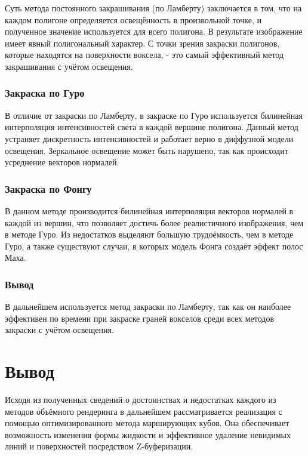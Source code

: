 Суть метода постоянного закрашивания (по Ламберту) заключается в том, что
на каждом полигоне определяется освещённость в произвольной точке, и полученное значение
используется для всего полигона\cite{site:fill}. В результате изображение имеет явный полигональный характер.
С точки зрения закраски полигонов, которые находятся на поверхности воксела, - это самый эффективный метод закрашивания с учётом освещения\cite{site:fill}.

\subsubsection{Закраска по Гуро}

В отличие от закраски по Ламберту, в закраске по Гуро используется билинейная интерполяция
интенсивностей света в каждой вершине полигона. Данный метод устраняет дискретность интенсивностей и работает верно в диффузной модели освещения. Зеркальное освещение может быть нарушено, так как происходит усреднение
векторов нормалей\cite{site:fill}.

\subsubsection{Закраска по Фонгу}

В данном методе производится билинейная интерполяция векторов нормалей в каждой из вершин, что
позволяет достичь более реалистичного изображения, чем в методе Гуро. Из недостатков выделяют
большую трудоёмкость, чем в методе Гуро, а также существуют случаи, в которых модель Фонга создаёт
эффект полос Маха\cite{site:fill}.

\subsubsection{Вывод}

В дальнейшем используется метод закраски по Ламберту, так как он наиболее эффективен по времени при закраске граней вокселов среди всех методов закраски с учётом освещения.

\section{Вывод}

Исходя из полученных сведений о достоинствах и недостатках каждого из методов объёмного
рендеринга в дальнейшем рассматривается реализация с помощью оптимизированного метода марширующих кубов. Она обеспечивает
возможность изменения формы жидкости и эффективное удаление невидимых линий и поверхностей посредством Z-буферизации.
